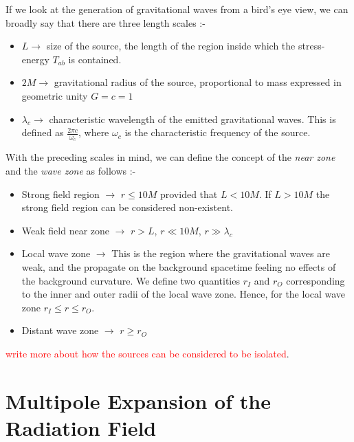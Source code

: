 \documentclass[a4paper,11pt]{article}
\begin{document}
If we look at the generation of gravitational waves from a bird's eye view, we can broadly say that there are three length scales :-
\begin{itemize}
	\item $ L  \rightarrow $ size of the source, the length of the region inside which the stress-energy $ T_{ab} $ is contained.
	
	\item $ 2M \rightarrow $ gravitational radius of the source, proportional to mass expressed in geometric unity $ G=c=1 $
	
	\item $ \lambda_c  \rightarrow $ characteristic wavelength of the emitted gravitational waves. This is defined as $ \frac{2\pi c}{\omega_c} $, where $ \omega_c $ is the characteristic frequency of the source.
\end{itemize}
With the preceding scales in mind, we can define the concept of the \textit{near zone} and the \textit{wave zone} as follows :-
\begin{itemize}
	\item Strong field region $ \rightarrow $ $ r \le 10 M $ provided that $ L < 10 M $. If $ L>10M $ the strong field region can be considered non-existent.
	\item Weak field near zone $ \rightarrow $ $ r > L $, $ r \ll 10 M $, $ r \gg \lambda_c $
	\item Local wave zone $ \rightarrow $ This is the region where the gravitational waves are weak, and the propagate on the background spacetime feeling no effects of the background curvature. We define two quantities $ r_I $ and $ r_O $ corresponding to the inner and outer radii of the local wave zone. Hence, for the local wave zone $  r_I \le r \le r_O $.
	\item Distant wave zone $ \rightarrow $  $ r\ge r_O $
\end{itemize}
\textcolor{red}{write more about how the sources can be considered to be isolated}.

\section{Multipole Expansion of the Radiation Field}
\end{document}
